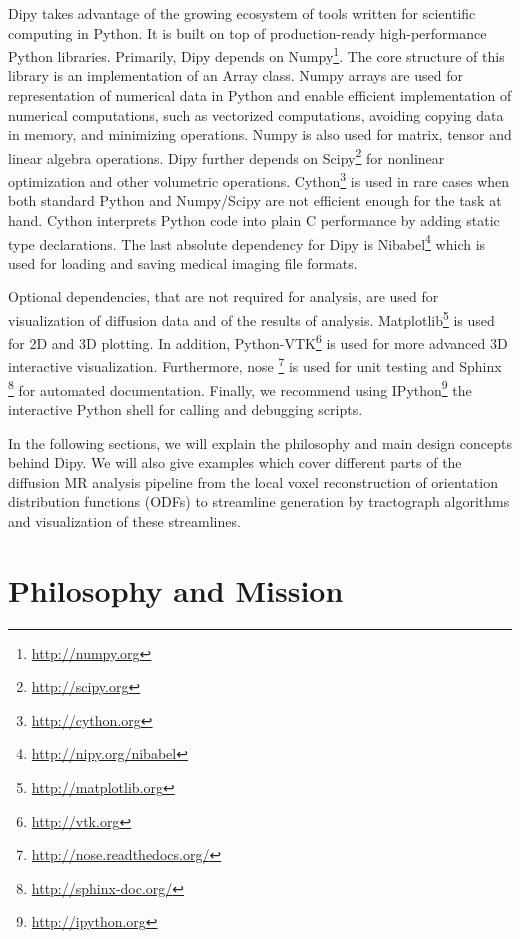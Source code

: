 \documentclass{bioinfo}
\begin{document}
Dipy takes advantage of the growing ecosystem of tools written for scientific
computing in Python. It is built on top of production-ready high-performance
Python libraries. Primarily, Dipy depends on
Numpy\footnote{\url{http://numpy.org}}. The core structure of this library is
an implementation of an Array \citep{van_numpy:11} class. Numpy arrays are used
for representation of numerical data in Python and enable efficient
implementation of numerical computations, such as vectorized computations,
avoiding copying data in memory, and minimizing operations. Numpy is also used
for matrix, tensor and linear algebra operations.  Dipy further depends on
Scipy\footnote{\url{http://scipy.org}} for nonlinear optimization and other
volumetric operations. Cython\footnote{\url{http://cython.org}} is used in rare
cases when both standard Python and Numpy/Scipy are not efficient enough for
the task at hand. Cython interprets Python code into plain C performance by
adding static type declarations. The last absolute dependency for Dipy is
Nibabel\footnote{\url{http://nipy.org/nibabel}} which is used for loading and
saving medical imaging file formats.


Optional dependencies, that are not required for analysis, are used for
visualization of diffusion data and of the results of
analysis. Matplotlib\footnote{\url{http://matplotlib.org}} is used for 2D and
3D plotting. In addition, Python-VTK\footnote{\url{http://vtk.org}} is used for
more advanced 3D interactive visualization. Furthermore, nose
\footnote{\url{http://nose.readthedocs.org/}} is used for unit
testing and Sphinx \footnote{\url{http://sphinx-doc.org/}} for automated
documentation. Finally, we recommend using
IPython\footnote{\url{http://ipython.org}} the interactive Python shell for
calling and debugging scripts.

In the following sections, we will explain the philosophy and main design
concepts behind Dipy. We will also give examples which cover different parts of
the diffusion MR analysis pipeline from the local voxel reconstruction of
orientation distribution functions (ODFs) to streamline generation by
tractograph algorithms and visualization of these streamlines.

\section{Philosophy and Mission}
\end{document}
